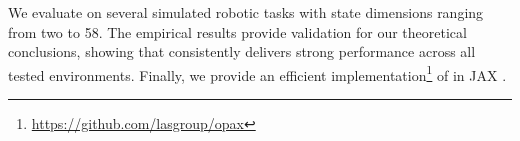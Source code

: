  We evaluate \opacex on several simulated robotic tasks with state dimensions ranging from two to 58. The empirical results provide validation for our theoretical conclusions, showing that \opacex consistently delivers strong performance across all tested environments.
 Finally, we provide an efficient implementation\footnote{\url{https://github.com/lasgroup/opax}} of \opacex in JAX \citep{jax2018github}.   
